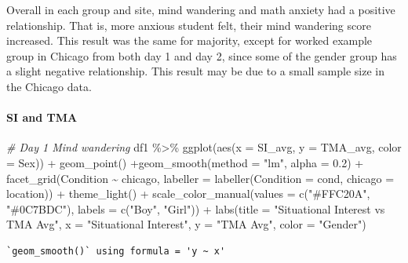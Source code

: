 \documentclass[
  letterpaper,
  DIV=11,
  numbers=noendperiod]{scrartcl}
\let\oldparagraph\paragraph
\renewcommand{\paragraph}[1]{\oldparagraph{#1}\mbox{}}
\newenvironment{Shaded}{\begin{snugshade}}{\end{snugshade}}
\newcommand{\AttributeTok}[1]{\textcolor[rgb]{0.49,0.56,0.16}{#1}}
\newcommand{\CommentTok}[1]{\textcolor[rgb]{0.38,0.63,0.69}{\textit{#1}}}
\newcommand{\FloatTok}[1]{\textcolor[rgb]{0.25,0.63,0.44}{#1}}
\newcommand{\FunctionTok}[1]{\textcolor[rgb]{0.02,0.16,0.49}{#1}}
\newcommand{\NormalTok}[1]{\textcolor[rgb]{0.00,0.44,0.13}{#1}}
\newcommand{\SpecialCharTok}[1]{\textcolor[rgb]{0.25,0.44,0.63}{#1}}
\newcommand{\StringTok}[1]{\textcolor[rgb]{0.25,0.44,0.63}{#1}}
\begin{document}
Overall in each group and site, mind wandering and math anxiety had a
positive relationship. That is, more anxious student felt, their mind
wandering score increased. This result was the same for majority, except
for worked example group in Chicago from both day 1 and day 2, since
some of the gender group has a slight negative relationship. This result
may be due to a small sample size in the Chicago data.

\hypertarget{si-and-tma}{%
\paragraph{SI and TMA}\label{si-and-tma}}

\begin{Shaded}
\begin{Highlighting}[]
\CommentTok{\# Day 1 Mind wandering}
\NormalTok{df1 }\SpecialCharTok{\%\textgreater{}\%} 
  \FunctionTok{ggplot}\NormalTok{(}\FunctionTok{aes}\NormalTok{(}\AttributeTok{x =}\NormalTok{ SI\_avg, }\AttributeTok{y =}\NormalTok{ TMA\_avg, }\AttributeTok{color =}\NormalTok{ Sex)) }\SpecialCharTok{+}
  \FunctionTok{geom\_point}\NormalTok{() }\SpecialCharTok{+}\FunctionTok{geom\_smooth}\NormalTok{(}\AttributeTok{method =} \StringTok{"lm"}\NormalTok{, }\AttributeTok{alpha =} \FloatTok{0.2}\NormalTok{) }\SpecialCharTok{+}
  \FunctionTok{facet\_grid}\NormalTok{(Condition }\SpecialCharTok{\textasciitilde{}}\NormalTok{ chicago, }
             \AttributeTok{labeller =} \FunctionTok{labeller}\NormalTok{(}\AttributeTok{Condition =}\NormalTok{ cond,}
                                 \AttributeTok{chicago =}\NormalTok{ location)) }\SpecialCharTok{+}
  \FunctionTok{theme\_light}\NormalTok{() }\SpecialCharTok{+}
  \FunctionTok{scale\_color\_manual}\NormalTok{(}\AttributeTok{values =} \FunctionTok{c}\NormalTok{(}\StringTok{"\#FFC20A"}\NormalTok{, }\StringTok{"\#0C7BDC"}\NormalTok{), }\AttributeTok{labels =} \FunctionTok{c}\NormalTok{(}\StringTok{"Boy"}\NormalTok{, }\StringTok{"Girl"}\NormalTok{)) }\SpecialCharTok{+}
  \FunctionTok{labs}\NormalTok{(}\AttributeTok{title =} \StringTok{"Situational Interest vs TMA Avg"}\NormalTok{,}
       \AttributeTok{x =} \StringTok{"Situational Interest"}\NormalTok{, }\AttributeTok{y =} \StringTok{"TMA Avg"}\NormalTok{, }\AttributeTok{color =} \StringTok{"Gender"}\NormalTok{)}
\end{Highlighting}
\end{Shaded}

\begin{verbatim}
`geom_smooth()` using formula = 'y ~ x'
\end{verbatim}
\end{document}
